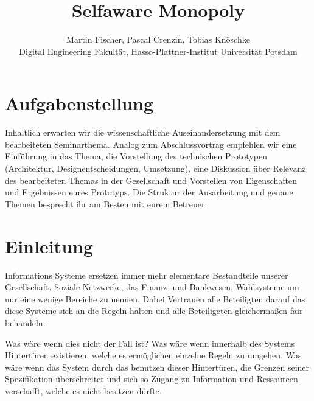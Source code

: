 \documentclass[german]{cgspaper} %
\title{Selfaware Monopoly}
\author{Martin Fischer, Pascal Crenzin, Tobias Knöschke\\ Digital Engineering Fakultät, Hasso-Plattner-Institut \textbar{} Universität Potsdam}
\begin{document}

\maketitle

\begin{abstract}
\end{abstract}

\copyrightspace %

\section{Aufgabenstellung}
Inhaltlich erwarten wir die wissenschaftliche Auseinandersetzung mit dem bearbeiteten Seminarthema. Analog zum Abschlussvortrag empfehlen wir eine Einführung in das Thema, die Vorstellung des technischen Prototypen (Architektur, Designentscheidungen, Umsetzung), eine Diskussion über Relevanz des bearbeiteten Themas in der Gesellschaft und Vorstellen von Eigenschaften und Ergebnissen eures Prototyps. Die Struktur der Ausarbeitung und genaue Themen besprecht ihr am Besten mit eurem Betreuer.

\section{Einleitung}

Informations Systeme ersetzen immer mehr elementare Bestandteile unserer Gesellschaft.
Soziale Netzwerke, das Finanz- und Bankwesen, Wahlsysteme um nur eine wenige Bereiche zu nennen.
Dabei Vertrauen alle Beteiligten darauf das diese Systeme sich an die Regeln halten und alle Beteiligeten gleichermaßen fair behandeln.

Was wäre wenn dies nicht der Fall ist? 
Was wäre wenn innerhalb des Systems Hintertüren existieren, welche es ermöglichen einzelne Regeln zu umgehen.
Was wäre wenn das System durch das benutzen dieser Hintertüren, die Grenzen seiner Spezifikation überschreitet und sich so Zugang zu Information und Ressourcen verschafft, welche es nicht besitzen dürfte.
\end{document}
